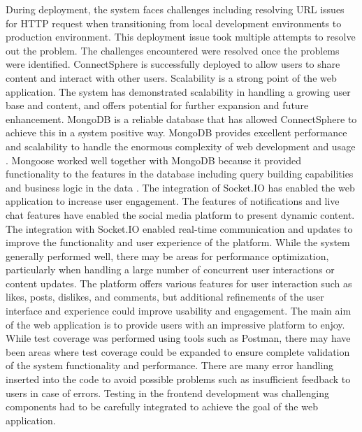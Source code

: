 During deployment, the system faces challenges including resolving URL issues for HTTP request when transitioning from local development environments to production environment. This deployment issue took multiple attempts to resolve out the problem. The challenges encountered were resolved once the problems were identified. ConnectSphere is successfully deployed to allow users to share content and interact with other users. Scalability is a strong point of the web application. The system has demonstrated scalability in handling a growing user base and content, and offers potential for further expansion and future enhancement. MongoDB is a reliable database that has allowed ConnectSphere to achieve this in a system positive way. MongoDB provides excellent performance and scalability to handle the enormous complexity of web development and usage \cite{aryal2020mern}. Mongoose worked well together with MongoDB because it provided functionality to the features in the database including query building capabilities and business logic in the data \cite{aryal2020mern}. The integration of Socket.IO has enabled the web application to increase user engagement. The features of notifications and live chat features have enabled the social media platform to present dynamic content. The integration with Socket.IO enabled real-time communication and updates to improve the functionality and user experience of the platform.
\newline \newline
While the system generally performed well, there may be areas for performance optimization, particularly when handling a large number of concurrent user interactions or content updates. The platform offers various features for user interaction such as likes, posts, dislikes, and comments, but additional refinements of the user interface and experience could improve usability and engagement. The main aim of the web application is to provide users with an impressive platform to enjoy. While test coverage was performed using tools such as Postman, there may have been areas where test coverage could be expanded to ensure complete validation of the system functionality and performance. There are many error handling inserted into the code to avoid possible problems such as insufficient feedback to users in case of errors. Testing in the frontend development was challenging components had to be carefully integrated to achieve the goal of the web application. 
\newline \newline
